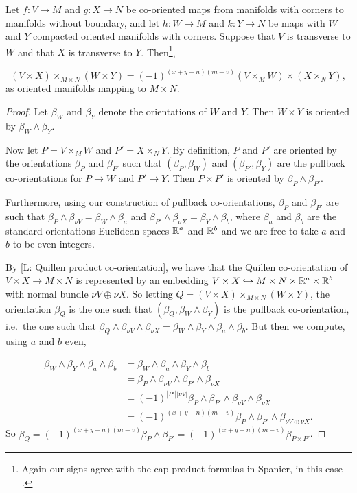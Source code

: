 \begin{proposition}\label{P: cap cross}
	Let $f \colon V \to M$ and $g:X \to N$ be co-oriented maps from manifolds with corners to manifolds without boundary, and let $h \colon W \to M$ and $k \colon Y \to N$ be maps with $W$ and $Y$ compacted oriented manifolds with corners.
	Suppose that $V$ is transverse to $W$ and that $X$ is transverse to $Y$.
	Then\footnote{Again our signs agree with the cap product formulas in Spanier, in this case \cite[Section 5.6.21]{Span81}.},

	$$(V \times X)\times_{M \times N} (W \times Y) = (-1)^{(x+y-n)(m-v)} (V \times_M W) \times (X \times_N Y),$$
	as oriented manifolds mapping to $M \times N$.
\end{proposition}
\begin{proof}
	Let $\beta_W$ and $\beta_Y$ denote the orientations of $W$ and $Y$.
	Then $W \times Y$ is oriented by $\beta_W \wedge \beta_Y$.

	Now let $P = V \times_M W$ and $P' = X \times_N Y$.
	By definition, $P$ and $P'$ are oriented by the orientations $\beta_P$ and $\beta_{P'}$ such that $(\beta_P,\beta_W)$ and $(\beta_{P'},\beta_Y)$ are the pullback co-orientations for $P \to W$ and $P' \to Y$.
	Then $P \times P'$ is oriented by $\beta_P \wedge \beta_{P'}$.

	Furthermore, using our construction of pullback co-orientations, $\beta_P$ and $\beta_{P'}$ are such that $\beta_P \wedge \beta_{\nu V} = \beta_W \wedge \beta_a$ and $\beta_{P'} \wedge \beta_{\nu X} = \beta_Y \wedge \beta_b$, where $\beta_a$ and $\beta_b$ are the standard orientations Euclidean spaces $\mathbb{R}^a$ and $\mathbb{R}^b$ and we are free to take $a$ and $b$ to be even integers.

	By \cref{L: Quillen product co-orientation}, we have that the Quillen co-orientation of $V \times X \to M \times N$ is represented by an embedding $V \times X \hookrightarrow M \times N \times \mathbb{R}^a \times \mathbb{R}^b$ with normal bundle $\nu V \oplus \nu X$.
	So letting $Q = (V \times X)\times_{M \times N} (W \times Y)$, the orientation $\beta_Q$ is the one such that $(\beta_Q,\beta_W \wedge \beta_Y)$ is the pullback co-orientation, i.e.\ the one such that $\beta_Q \wedge \beta_{\nu V} \wedge \beta_{\nu X} = \beta_W \wedge \beta_Y \wedge \beta_a \wedge \beta_b$.
	But then we compute, using $a$ and $b$ even,

	\begin{align*}
		\beta_W \wedge \beta_Y \wedge \beta_a \wedge \beta_b& = \beta_W \wedge \beta_a \wedge \beta_Y \wedge \beta_b\\
		& = \beta_P \wedge \beta_{\nu V} \wedge \beta_{P'} \wedge \beta_{\nu X}\\
		& = (-1)^{|P'||\nu V|}\beta_P \wedge \beta_{P'} \wedge \beta_{\nu V} \wedge \beta_{\nu X}\\
		& = (-1)^{(x+y-n)(m-v)}\beta_P \wedge \beta_{P'} \wedge \beta_{\nu V \oplus \nu X}.
	\end{align*}
	So $\beta_Q = (-1)^{(x+y-n)(m-v)}\beta_P \wedge \beta_{P'} = (-1)^{(x+y-n)(m-v)}\beta_{P \times P'}$.
\end{proof}

